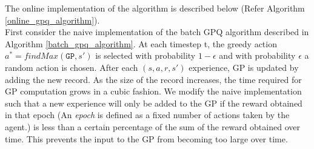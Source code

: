 \documentclass[12pt]{report}
\begin{document}
The online implementation of the algorithm is described below (Refer Algorithm \ref{online_gpq_algorithm}).\\
First consider the naive implementation of the batch GPQ algorithm described in Algorithm \ref{batch_gpq_algorithm}. At each timestep t, the greedy action $a^* = \textit{findMax}(\texttt{GP},s')$ is selected with probability $1 - \epsilon$ and with probability $\epsilon$ a random action is chosen. After each $(s, a, r, s')$ experience, GP is updated by adding the new record. As the size of the record increases, the time required for GP computation grows in a cubic fashion. We modify the naive implementation such that a new experience will only be added to the GP if the reward obtained in that epoch (An \textit{epoch} is defined as a fixed number of actions taken by the agent.) is less than a certain percentage of the sum of the reward obtained over time. This prevents the input to the GP from becoming too large over time.
\end{document}
